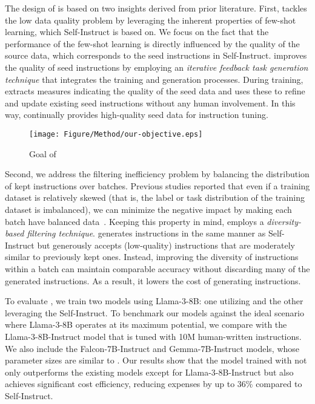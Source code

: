 The design of \ours{} is based on two insights derived from prior literature.
First, \ours{} tackles the low data quality problem
by leveraging the inherent properties of few-shot learning, 
which Self-Instruct is based on. 
We focus on the fact that the performance
of the few-shot learning is
directly influenced by the quality of the source data,
which corresponds to the seed instructions in Self-Instruct.
\ours{} improves the quality of seed instructions by employing
an \textit{iterative feedback task generation technique}
that integrates the training and generation processes.
During training, \ours{} extracts measures indicating the quality of 
the seed data and uses these to refine and update existing seed
instructions without any human involvement.
In this way, \ours{} continually provides high-quality seed data
for instruction tuning.

\begin{figure}
    \centering
    \texttt{[image: Figure/Method/our-objective.eps]}
    \caption{Goal of \ours{}}
    \label{fig:objective}
\end{figure}

Second, we address the filtering inefficiency problem
by balancing the distribution
of kept instructions over batches.
Previous studies reported that even if
a training dataset is relatively skewed (that is,
the label or task distribution of the training dataset is imbalanced),
we can minimize the negative impact by making each batch 
have balanced data~\cite{8215530}.
Keeping this property in mind, \ours{} employs a \textit{diversity-based filtering
technique}. \ours{} generates instructions in the same manner
as Self-Instruct but generously accepts (low-quality) instructions 
that are moderately similar to previously kept ones.
Instead, improving the diversity of instructions 
within a batch can maintain comparable accuracy
without discarding many of the generated instructions. As a result,
it lowers the cost of generating instructions.


To evaluate \ours{}, we train two models using Llama-3-8B:
one utilizing \ours{} and the other leveraging the Self-Instruct.
To benchmark our models against the ideal scenario where Llama-3-8B
operates at its maximum potential,
we compare \ours{} with the Llama-3-8B-Instruct model that is
tuned with 10M human-written instructions.
We also include the Falcon-7B-Instruct and Gemma-7B-Instruct
models, whose parameter sizes are similar to \ours{}.
Our results show that the model trained with \ours{} not only outperforms
the existing models except for Llama-3-8B-Instruct 
but also achieves significant cost efficiency, reducing expenses by up to 36\% compared to Self-Instruct.




